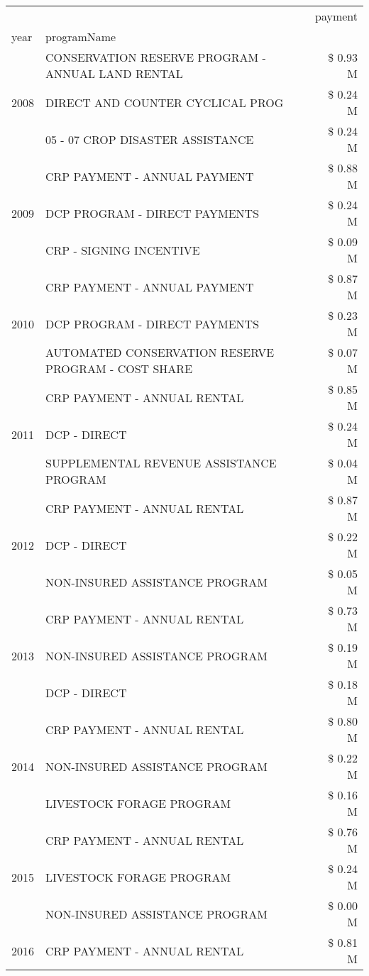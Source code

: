 \begin{tabular}{llr}
\toprule
 &  & payment \\
year & programName &  \\
\midrule
\multirow[t]{3}{*}{2008} & CONSERVATION RESERVE PROGRAM - ANNUAL LAND RENTAL & \$ 0.93 M \\
 & DIRECT AND COUNTER CYCLICAL PROG & \$ 0.24 M \\
 & 05 - 07 CROP DISASTER ASSISTANCE & \$ 0.24 M \\
\cline{1-3}
\multirow[t]{3}{*}{2009} & CRP PAYMENT - ANNUAL PAYMENT & \$ 0.88 M \\
 & DCP PROGRAM - DIRECT PAYMENTS & \$ 0.24 M \\
 & CRP - SIGNING INCENTIVE & \$ 0.09 M \\
\cline{1-3}
\multirow[t]{3}{*}{2010} & CRP PAYMENT - ANNUAL PAYMENT & \$ 0.87 M \\
 & DCP PROGRAM - DIRECT PAYMENTS & \$ 0.23 M \\
 & AUTOMATED CONSERVATION RESERVE PROGRAM - COST SHARE & \$ 0.07 M \\
\cline{1-3}
\multirow[t]{3}{*}{2011} & CRP PAYMENT - ANNUAL RENTAL & \$ 0.85 M \\
 & DCP - DIRECT & \$ 0.24 M \\
 & SUPPLEMENTAL REVENUE ASSISTANCE PROGRAM & \$ 0.04 M \\
\cline{1-3}
\multirow[t]{3}{*}{2012} & CRP PAYMENT - ANNUAL RENTAL & \$ 0.87 M \\
 & DCP - DIRECT & \$ 0.22 M \\
 & NON-INSURED ASSISTANCE PROGRAM & \$ 0.05 M \\
\cline{1-3}
\multirow[t]{3}{*}{2013} & CRP PAYMENT - ANNUAL RENTAL & \$ 0.73 M \\
 & NON-INSURED ASSISTANCE PROGRAM & \$ 0.19 M \\
 & DCP - DIRECT & \$ 0.18 M \\
\cline{1-3}
\multirow[t]{3}{*}{2014} & CRP PAYMENT - ANNUAL RENTAL & \$ 0.80 M \\
 & NON-INSURED ASSISTANCE PROGRAM & \$ 0.22 M \\
 & LIVESTOCK FORAGE PROGRAM & \$ 0.16 M \\
\cline{1-3}
\multirow[t]{3}{*}{2015} & CRP PAYMENT - ANNUAL RENTAL & \$ 0.76 M \\
 & LIVESTOCK FORAGE PROGRAM & \$ 0.24 M \\
 & NON-INSURED ASSISTANCE PROGRAM & \$ 0.00 M \\
\cline{1-3}
\multirow[t]{3}{*}{2016} & CRP PAYMENT - ANNUAL RENTAL                   & \$ 0.81 M \\

\end{tabular}
